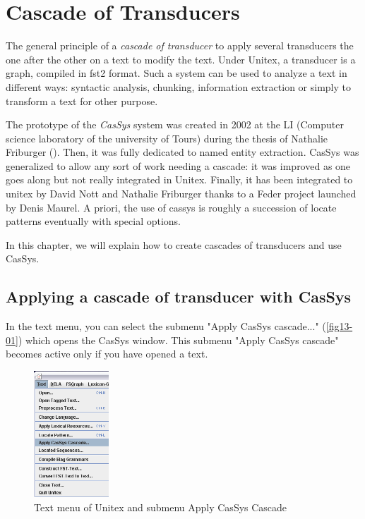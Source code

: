 \chapter{Cascade of Transducers}
\label{chap-cassys}

The general principle of a \textit{cascade of transducer}   to apply several transducers the one 
after the other on a text to modify the text. Under Unitex, a transducer is a graph, 
compiled in fst2 format. Such a system can be used to analyze a text in different ways: 
syntactic analysis, chunking, information extraction or simply to transform a text for other purpose.

\bigskip
\noindent The prototype of the \textit{CasSys}  system was created in 2002 at the LI 
(Computer science laboratory of the university of Tours) during the thesis of Nathalie Friburger (\cite{reco-np-friburger02}). 
Then, it was fully dedicated to named entity extraction. CasSys was generalized to allow any sort of work needing a cascade:
 it was improved as one goes along but not really integrated in Unitex. 
 Finally, it has been integrated to unitex by David Nott and Nathalie Friburger thanks to a Feder project launched by Denis Maurel.
A priori, the use of cassys is roughly a succession of locate patterns eventually with special options. 

\bigskip
\noindent In this chapter, we will explain how to create cascades of transducers and use CasSys.

\section{Applying a cascade of transducer with CasSys}
\label{section:applyCascade}

In the text menu, you can select the submenu "Apply CasSys cascade..." (\ref{fig13-01}) which opens the CasSys window.
This submenu "Apply CasSys cascade" becomes active only if you have opened a text.

\begin{figure}[!htb]
 \centering
 \includegraphics[width=2.8cm]{resources/img/fig13-01.png}
 \caption{Text menu of Unitex and submenu Apply CasSys Cascade}
 \label{fig:fig13-01}
\end{figure}


